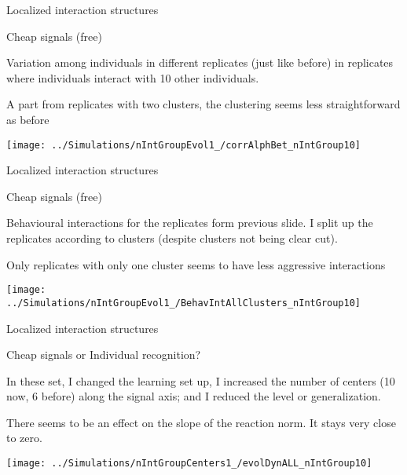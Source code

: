 \documentclass[
  ignorenonframetext,
]{beamer}
\begin{document}
\begin{frame}{Localized interaction structures}
\protect\hypertarget{localized-interaction-structures-1}{}

\begin{block}{Cheap signals (free)}

\small

Variation among individuals in different replicates (just like before)
in replicates where individuals interact with 10 other individuals.

A part from replicates with two clusters, the clustering seems less
straightforward as before

\begin{center}\texttt{[image: ../Simulations/nIntGroupEvol1\_/corrAlphBet\_nIntGroup10]} \end{center}

\end{block}

\end{frame}

\begin{frame}{Localized interaction structures}
\protect\hypertarget{localized-interaction-structures-2}{}

\begin{block}{Cheap signals (free)}

\small

Behavioural interactions for the replicates form previous slide. I split
up the replicates according to clusters (despite clusters not being
clear cut).

Only replicates with only one cluster seems to have less aggressive
interactions

\begin{center}\texttt{[image: ../Simulations/nIntGroupEvol1\_/BehavIntAllClusters\_nIntGroup10]} \end{center}

\end{block}

\end{frame}

\begin{frame}{Localized interaction structures}
\protect\hypertarget{localized-interaction-structures-3}{}

\begin{block}{Cheap signals or Individual recognition?}

\tiny

In these set, I changed the learning set up, I increased the number of
centers (10 now, 6 before) along the signal axis; and I reduced the
level or generalization.

There seems to be an effect on the slope of the reaction norm. It stays
very close to zero.

\begin{center}\texttt{[image: ../Simulations/nIntGroupCenters1\_/evolDynALL\_nIntGroup10]} \end{center}

\end{block}

\end{frame}
\end{document}
